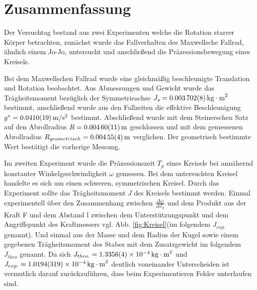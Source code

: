 
\section{Zusammenfassung}\label{kap:Zusammenfassung}

Der Versuchtag bestand aus zwei Experimenten welche die Rotation starrer Körper betrachten, zunächst wurde das Fallverhalten des Maxwellsche Fallrad, ähnlich einem Jo-Jo, untersucht und anschließend die Präzessionsbewegung eines Kreisels. 



Bei dem Maxwellschen Fallrad wurde eine gleichmäßig beschleunigte Translation und Rotation beobachtet.
Aus Abmessungen und Gewicht wurde das Trägheitsmoment bezüglich der Symmetrieachse $J_s=\SI{0.003702 \pm 0.000008}{kg\cdot m^2}$ bestimmt, anschließend wurde aus den Fallzeiten die effektive Beschleunigung  $g^*=\SI{0.0410 \pm  0.0019}{m \per s \squared}$ bestimmt. Abschließend wurde mit dem Steinerschen Satz auf den Abrollradius $R=\SI{0.00460\pm 0.00011}{m}$ geschlossen und mit dem gemessenen Abrollradius $R_{geometrisch}=\SI{0.00455 \pm 0.00004}{m}$ verglichen. Der geometrisch bestimmte Wert bestätigt die vorherige Messung. 







Im zweiten Experiment wurde die Präzessionszeit $T_p$ eines Kreisels bei annähernd konstanter Winkelgeschwindigkeit $\omega$ gemessen. Bei dem untersuchten Kreisel handelte es sich um einen schweren, symmetrischen Kreisel.
Durch das Experiment sollte das Trägheitsmoment $J$ des Kreisels bestimmt werden. Einmal experimentell über den Zusammenhang zwischen $\frac{\Delta \omega}{\Delta T_p}$ und dem Produkt aus der Kraft F und dem Abstand l zwischen dem Unterstützungspunkt und dem Angriffspunkt des Kraftmessers vgl. Abb. \ref{fig:Kreisel}(im folgendem $J_{exp.}$ genannt). Und einmal aus der Masse und dem Radius der Kugel sowie einem gegebenen Trägheitsmoment des Stabes mit dem Zusatzgewicht im folgendem $J_{theo}$ genannt. Da sich $J_{theo.}=\SI{1,3356+-0,0004e-4}{kg \cdot m^2}$ und $J_{exp.}=\SI{1,0194+-0,0319e-4}{kg \cdot m^2}$ deutlich voneinander Unterscheiden ist vermutlich darauf zurückzuführen, dass beim Experimentieren Fehler unterlaufen sind.  
 









